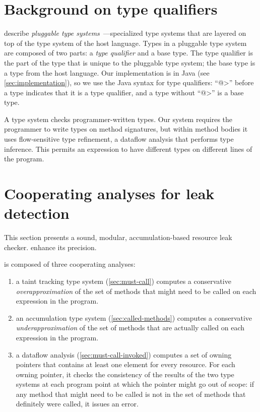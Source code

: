 \section{Background on type qualifiers}
\label{sec:background}

 describe
\emph{pluggable type systems}~\cite{FosterFFA99}---specialized type
systems that are layered on top of the type system of the host
language.  Types in a pluggable type system are composed of two parts:
a \emph{type qualifier} and a base type. The type qualifier is the
part of the type that is unique to the pluggable type system; the base
type is a type from the host language. Our implementation is in Java
(see \cref{sec:implementation}), so we use the Java syntax for type
qualifiers: ``\<@>'' before a type indicates that it is a type
qualifier, and a type without ``\<@>'' is a base type.

A type system checks programmer-written types.  Our system requires the
programmer to write types on method signatures, but within method bodies it
uses flow-sensitive type refinement, a dataflow analysis that performs type
inference.  This permits an expression to have different types on different
lines of the program.



\section{Cooperating analyses for leak detection}
\label{sec:base-type-systems}

This section presents a sound, modular, accumulation-based
resource leak checker.
enhance its precision.

\Tool is composed of three cooperating analyses:
\begin{enumerate}
\item a taint tracking type system (\cref{sec:must-call}) computes a conservative
  \emph{overapproximation} of the set of methods that might need to be called
  on each expression in the program.
\item an accumulation type system (\cref{sec:called-methods}) computes
  a conservative \emph{underapproximation} of the set of methods that are
  actually called on each expression in the program.
\item a dataflow analysis (\cref{sec:must-call-invoked}) computes a set
  of owning pointers that contains at least one element for every resource.
  For each owning pointer, it checks the consistency of the results
  of the two type systems at each program
  point at which the pointer might go out of scope:
  if any method that might need to be called is not in the set of methods
  that definitely were called, it issues an error.
\end{enumerate}

